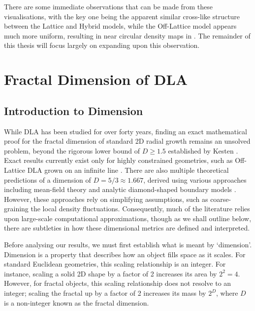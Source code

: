 \documentclass[12pt, a4paper, oneside]{report}
\theoremstyle{remark}
\begin{document}
There are some immediate observations that can be made from these visualisations, with the key one being the apparent similar cross-like structure between the Lattice and Hybrid models, while the Off-Lattice model appears much more uniform, resulting in near circular density maps in . The remainder of this thesis will focus largely on expanding upon this observation.


\chapter{Fractal Dimension of DLA}
\label{ch:dim}

\section{Introduction to Dimension}
\label{sec:dim_overview}
While DLA has been studied for over forty years, finding an exact mathematical proof for the fractal dimension of standard 2D radial growth remains an unsolved problem, beyond the rigorous lower bound of $D \ge 1.5$ established by Kesten \cite{Kesten1987}. Exact results currently exist only for highly constrained geometries, such as Off-Lattice DLA grown on an infinite line \cite{Procaccia2021}. There are also multiple theoretical predictions of a dimension of $D=5/3 \approx 1.667$, derived using various approaches including mean-field theory \cite{tokuyama1984} and analytic diamond-shaped boundary models \cite{Ball1985}. However, these approaches rely on simplifying assumptions, such as coarse-graining the local density fluctuations. Consequently, much of the literature relies upon large-scale computational approximations, though as we shall outline below, there are subtleties in how these dimensional metrics are defined and interpreted.

Before analysing our results, we must first establish what is meant by `dimension'. 
Dimension is a property that describes how an object fills space as it scales. For standard Euclidean geometries, this scaling relationship is an integer. For instance, scaling a solid 2D shape by a factor of 2 increases its area by $2^2 = 4$. However, for fractal objects, this scaling relationship does not resolve to an integer; scaling the fractal up by a factor of 2 increases its mass by $2^D$, where $D$ is a non-integer known as the fractal dimension. 
\end{document}
